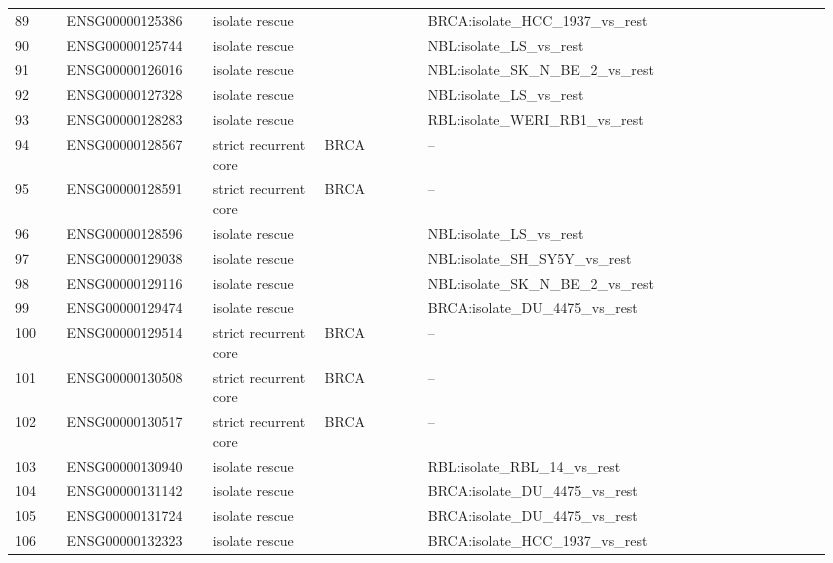 \begin{landscape}
{\begin{longtable}{p{0.06\linewidth}p{0.17\linewidth}p{0.13\linewidth}p{0.12\linewidth}p{0.47\linewidth}}
89 & ENSG00000125386 & isolate rescue &  & BRCA:isolate\_\allowbreak{}HCC\_\allowbreak{}1937\_\allowbreak{}vs\_\allowbreak{}rest \\
90 & ENSG00000125744 & isolate rescue &  & NBL:isolate\_\allowbreak{}LS\_\allowbreak{}vs\_\allowbreak{}rest \\
91 & ENSG00000126016 & isolate rescue &  & NBL:isolate\_\allowbreak{}SK\_\allowbreak{}N\_\allowbreak{}BE\_\allowbreak{}2\_\allowbreak{}vs\_\allowbreak{}rest \\
92 & ENSG00000127328 & isolate rescue &  & NBL:isolate\_\allowbreak{}LS\_\allowbreak{}vs\_\allowbreak{}rest \\
93 & ENSG00000128283 & isolate rescue &  & RBL:isolate\_\allowbreak{}WERI\_\allowbreak{}RB1\_\allowbreak{}vs\_\allowbreak{}rest \\
94 & ENSG00000128567 & strict recurrent core & BRCA & -- \\
95 & ENSG00000128591 & strict recurrent core & BRCA & -- \\
96 & ENSG00000128596 & isolate rescue &  & NBL:isolate\_\allowbreak{}LS\_\allowbreak{}vs\_\allowbreak{}rest \\
97 & ENSG00000129038 & isolate rescue &  & NBL:isolate\_\allowbreak{}SH\_\allowbreak{}SY5Y\_\allowbreak{}vs\_\allowbreak{}rest \\
98 & ENSG00000129116 & isolate rescue &  & NBL:isolate\_\allowbreak{}SK\_\allowbreak{}N\_\allowbreak{}BE\_\allowbreak{}2\_\allowbreak{}vs\_\allowbreak{}rest \\
99 & ENSG00000129474 & isolate rescue &  & BRCA:isolate\_\allowbreak{}DU\_\allowbreak{}4475\_\allowbreak{}vs\_\allowbreak{}rest \\
100 & ENSG00000129514 & strict recurrent core & BRCA & -- \\
101 & ENSG00000130508 & strict recurrent core & BRCA & -- \\
102 & ENSG00000130517 & strict recurrent core & BRCA & -- \\
103 & ENSG00000130940 & isolate rescue &  & RBL:isolate\_\allowbreak{}RBL\_\allowbreak{}14\_\allowbreak{}vs\_\allowbreak{}rest \\
104 & ENSG00000131142 & isolate rescue &  & BRCA:isolate\_\allowbreak{}DU\_\allowbreak{}4475\_\allowbreak{}vs\_\allowbreak{}rest \\
105 & ENSG00000131724 & isolate rescue &  & BRCA:isolate\_\allowbreak{}DU\_\allowbreak{}4475\_\allowbreak{}vs\_\allowbreak{}rest \\
106 & ENSG00000132323 & isolate rescue &  & BRCA:isolate\_\allowbreak{}HCC\_\allowbreak{}1937\_\allowbreak{}vs\_\allowbreak{}rest \\

\end{longtable}}
\end{landscape}
